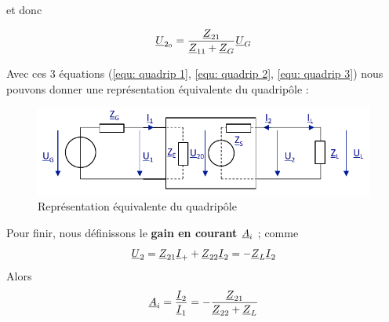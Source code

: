 \documentclass[12pt,a4paper]{article}
\newcommand{\uz}{\uline{Z} }
\newcommand{\ui}{\uline{I} }
\newcommand{\uu}{\uline{U} }
\newcommand{\ua}{\uline{A} }
\begin{document}
et donc 
\begin{boite}[0.6]
	\begin{equation}
		\uu_{2_0} = \frac{\uz_{21}}{\uz_{11} + \uz_G}\uu_G
		\label{equ: quadrip 3}
	\end{equation}
\end{boite}
Avec ces 3 équations (\ref{equ: quadrip 1}, \ref{equ: quadrip 2}, \ref{equ: quadrip 3}) nous pouvons donner une représentation équivalente du quadripôle :
\begin{figure}[!h]
	\centering
	\includegraphics[scale=0.65]{images/quadripole_circuit_5}
	\caption{Représentation équivalente du quadripôle}
\end{figure}

Pour finir, nous définissons le \textbf{gain en courant $\ua_i$} ; comme 
\[\uu_2 = \uz_{21} \ui_+ + \uz_{22}\ui_2 = -\uz_L\ui_2\]
Alors
\begin{equation}
	\ua_i = \frac{\ui_2}{\ui_1} = -\frac{\uz_{21}}{\uz_{22} + \uz_L}	
\end{equation}
\end{document}
